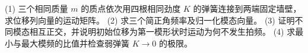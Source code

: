 (1) 三个相同质量 \(m\) 的质点依次用四根相同劲度 \(K\) 的弹簧连接到两端固定墙壁，求位移列向量的运动矩阵。
(2) 求三个简正角频率及归一化模态向量。
(3) 证明不同模态相互正交，并说明初始位移为第一模形状时运动为何不发生拍频。
(4) 求最小与最大模频的比值并检查弱弹簧 \(K\to0\) 的极限。
